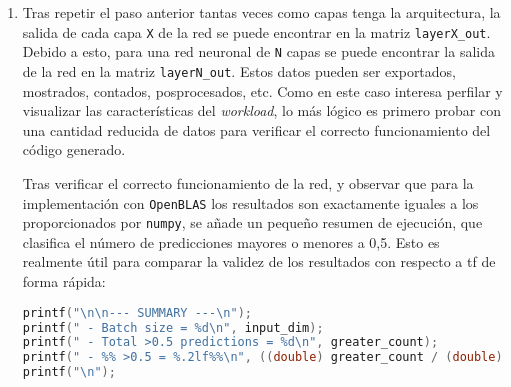 \begin{enumerate}
    Si bien es cierto que en lugar de aplicar los \textit{bias} junto a la función de transferencia en la función previa, es posible realizar $C = AB + bias$, con una copia de \textit{bias} por fila, es mejor realizar esta operación en conjunción con la aplicación de la función de transferencia, ya que así se obtiene una mayor intensidad aritmética. Esta mayor intensidad es especialmente relevante cuando si paraleliza la función, ya que lo más probable es que \texttt{map\_and\_bias} sea \textit{memory-bound} en mayor o menor medida según la función de transferencia. Además, si se operase sobre una matriz pre-inicializada con los \textit{bias} en cada fila, se necesitaría replicar los valores de \textit{bias} \texttt{input\_dim}\footnote{\texttt{input\_dim} es el número de filas de la entrada, es decir, el número de datos multidimensionales que entran a la red.} veces, replicación que no es gratuita, ya que sería indudablemente \textit{memory-bound}, por lo que es más conveniente fusionar los bucles en uno solo para optimizar los accesos a memoria principal.

    Una implementación básica de \texttt{map\_and\_bias} es similar a la siguiente:\medskip
\begin{lstlisting}[language=C]
void map_and_bias__fp32(fp32 *restrict A, const fp32 *restrict bias, const uint32_t M, const uint32_t N, fp32 (* map_function)(fp32 x)){
    for (uint32_t i = 0; i < M; i++){
        for(uint32_t j = 0; j < N; j++){
            A[i*N+j].val = map_function((fp32)(A[i*N+j].val +
                                        bias[j].val)).val;
        }
    }
}
\end{lstlisting}

    \item Tras repetir el paso anterior tantas veces como capas tenga la arquitectura, la salida de cada capa \texttt{X} de la red se puede encontrar en la matriz \texttt{layerX\_out}. Debido a esto, para una red neuronal de \texttt{N} capas se puede encontrar la salida de la red en la matriz \texttt{layerN\_out}. Estos datos pueden ser exportados, mostrados, contados, posprocesados, etc. Como en este caso interesa perfilar y visualizar las características del \textit{workload}, lo más lógico es primero probar con una cantidad reducida de datos para verificar el correcto funcionamiento del código generado.
    
    Tras verificar el correcto funcionamiento de la red, y observar que para la implementación con \texttt{OpenBLAS} los resultados son exactamente iguales a los proporcionados por \texttt{numpy}, se añade un pequeño resumen de ejecución, que clasifica el número de predicciones mayores o menores a 0,5. Esto es realmente útil para comparar la validez de los resultados con respecto a \acrlong{tf} de forma rápida:\medskip
\begin{lstlisting}[language=C]
printf("\n\n--- SUMMARY ---\n");
printf(" - Batch size = %d\n", input_dim);
printf(" - Total >0.5 predictions = %d\n", greater_count);
printf(" - %% >0.5 = %.2lf%%\n", ((double) greater_count / (double) input_dim)*100);
printf("\n");
\end{lstlisting}

\end{enumerate}


